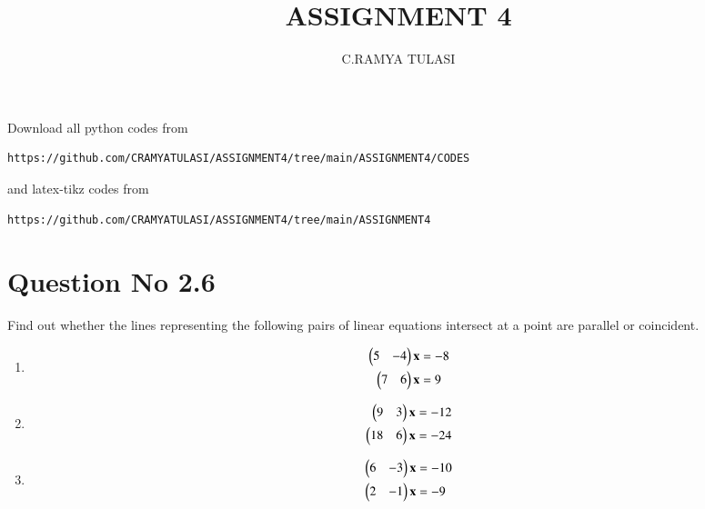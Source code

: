 \documentclass[journal,12pt,twocolumn]{IEEEtran}
\begin{document}
     \def\rightbox#1{\makebox[0in][r]{#1}}
     \def\centbox#1{\makebox[0in]{#1}}
     \def\topbox#1{\raisebox{-\baselineskip}[0in][0in]{#1}}
     \def\midbox#1{\raisebox{-0.5\baselineskip}[0in][0in]{#1}}
\vspace{3cm}
\title{ASSIGNMENT 4}
\author{C.RAMYA TULASI}
\maketitle
\newpage
\bigskip
\renewcommand{\thefigure}{\theenumi}
\renewcommand{\thetable}{\theenumi}
Download all python codes from 
\begin{lstlisting}
https://github.com/CRAMYATULASI/ASSIGNMENT4/tree/main/ASSIGNMENT4/CODES
\end{lstlisting}
%
and latex-tikz codes from 
%
\begin{lstlisting}
https://github.com/CRAMYATULASI/ASSIGNMENT4/tree/main/ASSIGNMENT4
\end{lstlisting}
%
\section{Question No 2.6}
Find out whether the lines representing the following pairs of linear equations intersect at a point are parallel or coincident.
%
\begin{enumerate}
\item
\begin{align}
\begin{split}
\begin{pmatrix}5 & -4 \end{pmatrix}\mathbf{x}&=-8
\\
\begin{pmatrix}7 & 6 \end{pmatrix}\mathbf{x}&=9 \label{1.0.1}
\end{split}
\end{align}
\item
\begin{align}
\begin{split}
\begin{pmatrix}9 & 3 \end{pmatrix}\mathbf{x}&=-12
\\
\begin{pmatrix}18 & 6 \end{pmatrix}\mathbf{x}&=-24 \label{1.0.2}
\end{split}
\end{align}
\item
\begin{align}
\begin{split}
\begin{pmatrix}6 & -3 \end{pmatrix}\mathbf{x}&=-10
\\
\begin{pmatrix}2 & -1 \end{pmatrix}\mathbf{x}&=-9\label{1.0.3}
\end{split}
\end{align}
\end{enumerate}
%
\end{document}
